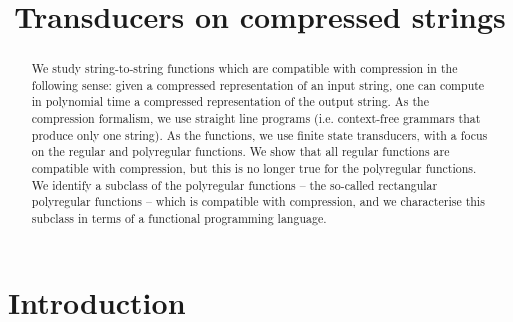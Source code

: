 \documentclass{article}
\begin{document}
\title{Transducers on compressed strings}

\maketitle

\begin{abstract}
We study string-to-string functions which are compatible with compression in the following sense: given a compressed representation of an input string, one can compute in polynomial time a compressed representation of the output string. As the compression formalism, we use straight line programs (i.e. context-free grammars that produce only one string). As the functions, we use finite state transducers, with a focus on the regular and polyregular functions. We show that all regular functions are compatible with compression, but this is no longer true for the polyregular functions. We identify a subclass of the polyregular functions -- the so-called rectangular polyregular functions -- which is compatible with compression, and we characterise this subclass in terms of a functional programming language.\end{abstract}

\newpage
\section{Introduction}
\end{document}
